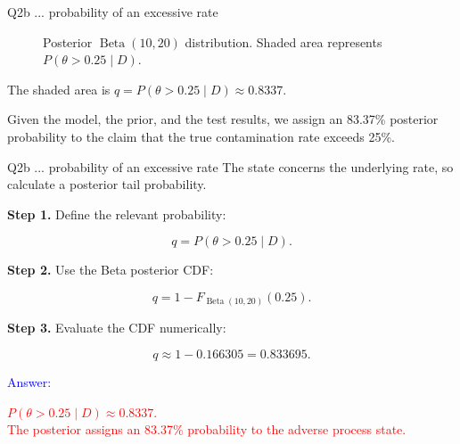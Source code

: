 \documentclass[aspectratio=43,10pt]{beamer}
\newcommand{\answer}[1]{\textcolor{red}{#1}}
\begin{document}
\begin{frame}{}
\begin{block}{Q2b ... probability of an excessive rate}
\begin{figure}[ht]
\centering
{}
\caption{\footnotesize Posterior $\operatorname{Beta}(10,20)$ distribution. Shaded
area represents $P(\theta>0.25\mid D)$.}
\end{figure}

The shaded area is $q=P(\theta>0.25\mid D)\approx0.8337.$

Given the model, the prior, and the test results, we assign an 83.37\%
posterior probability to the claim that the true contamination rate exceeds
25\%.

\end{block}
\end{frame}

\begin{frame}{}
\begin{block}{Q2b ... probability of an excessive rate}
  The state concerns the underlying rate, so calculate a posterior tail
  probability.
  
  \textbf{Step 1.} Define the relevant probability:

  \[
  q=P(\theta>0.25\mid D).
  \]
  
  \textbf{Step 2.} Use the Beta posterior CDF:

  \[
  q=1-F_{\operatorname{Beta}(10,20)}(0.25).
  \]
    
  \textbf{Step 3.} Evaluate the CDF numerically:

  \[
  q\approx1-0.166305=0.833695.
  \]

  \textcolor{blue}{Answer:}

  \answer{
    $P(\theta>0.25\mid D)\approx0.8337$.\\
    The posterior assigns an 83.37\% probability to the adverse process
    state.
  }
\end{block}
\end{frame}
\end{document}
